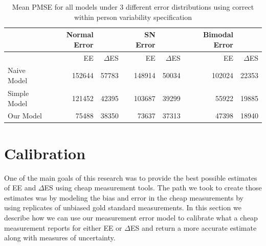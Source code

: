 \documentclass[11pt]{article}\usepackage[]{graphicx}\usepackage[]{color}
\begin{document}
%   
% 
% 

\begin{table}[ht]
\centering
\begin{tabular}{l|rr|rr|rr}
  \hline
 & Normal Error & & SN Error & & Bimodal Error & \\ 
  \hline
  & EE & $\Delta$ES & EE & $\Delta$ES & EE & $\Delta$ES \\
  \hline
  Naive Model & 152644 & 57783 & 148914 & 50034 & 102024 & 22353 \\
  Simple Model & 121452  & 42395 & 103687 & 39299 & 55922 & 19885 \\
  Our Model & 75488 & 38350 & 73637 & 37313 & 47398 & 18940 \\
   \hline
\end{tabular}
\caption{Mean PMSE for all models under 3 different error distributions using correct within person variability specification}
\label{pmse2}
\end{table}


\section{Calibration}

One of the main goals of this research was to provide the best possible estimates of EE and $\Delta$ES using cheap measurement tools. The path we took to create those estimates was by modeling the bias and error in the cheap measurements by using replicates of unbiased gold standard measurements. In this section we describe how we can use our measurement error model to calibrate what a cheap measurement reports for either EE or $\Delta$ES and return a more accurate estimate along with measures of uncertainty. 
\end{document}

